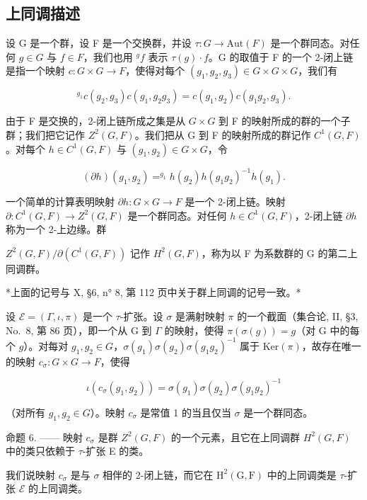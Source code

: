 \subsection{上同调描述}

设 G 是一个群，设 F 是一个交换群，并设 \(\tau: G \to \text{Aut}(F)\) 是一个群同态。对任何 \(g \in G\) 与 \(f \in F\)，我们也用 \(^{g}f\) 表示 \(\tau(g) \cdot f\)。G 的取值于 F 的一个 2-闭上链是指一个映射 \(c: G \times G \to F\)，使得对每个 \((g_{1}, g_{2}, g_{3}) \in G \times G \times G\)，我们有

\[
{ } ^ { g _ { 1 } } c ( g _ { 2 } , g _ { 3 } ) c ( g _ { 1 } , g _ { 2 } g _ { 3 } ) = c ( g _ { 1 } , g _ { 2 } ) c ( g _ { 1 } g _ { 2 } , g _ { 3 } ) .\tag{7}
\]

由于 F 是交换的，2-闭上链所成之集是从 \(G \times G\) 到 F 的映射所成的群的一个子群；我们把它记作 \(Z^{2}(G,F)\)。我们把从 G 到 F 的映射所成的群记作 \(C^{1}(G,F)\)。对每个 \(h \in C^{1}(G,F)\) 与 \((g_{1}, g_{2}) \in G \times G\)，令

\[
(\partial h) (g _ {1}, g _ {2}) = ^ {g _ {1}} h (g _ {2}) h (g _ {1} g _ {2}) ^ {- 1} h (g _ {1}).\tag{8}
\]

一个简单的计算表明映射 \(\partial h: G \times G \to F\) 是一个 2-闭上链。映射 \(\partial: C^{1}(G, F) \to Z^{2}(G, F)\) 是一个群同态。对任何 \(h \in C^{1}(G, F)\)，2-闭上链 \(\partial h\) 称为一个 2-上边缘。群

\(Z^{2}(G,F)/\partial(C^{1}(G,F))\) 记作 \(H^{2}(G,F)\)，称为以 F 为系数群的 G 的第二上同调群。

*上面的记号与 X, §6, n° 8, 第 112 页中关于群上同调的记号一致。*

设 \(\mathcal{E} = (\Gamma, \iota, \pi)\) 是一个 \(\tau\)-扩张。设 \(\sigma\) 是满射映射 \(\pi\) 的一个截面（集合论, II, §3, No.~8, 第 86 页），即一个从 G 到 \(\Gamma\) 的映射，使得 \(\pi(\sigma(g)) = g\)（对 G 中的每个 \(g\)）。对每对 \(g_1, g_2 \in G\)，\(\sigma(g_1)\sigma(g_2)\sigma(g_1g_2)^{-1}\) 属于 \(\mathrm{Ker}(\pi)\)，故存在唯一的映射 \(c_\sigma: G \times G \to F\)，使得

\[
\iota (c _ {\sigma} (g _ {1}, g _ {2})) = \sigma (g _ {1}) \sigma (g _ {2}) \sigma (g _ {1} g _ {2}) ^ {- 1}\tag{9}
\]

（对所有 \(g_{1}, g_{2} \in G\)）。映射 \(c_{\sigma}\) 是常值 1 的当且仅当 \(\sigma\) 是一个群同态。

命题 6. —— 映射 \(c_{\sigma}\) 是群 \(Z^{2}(G,F)\) 的一个元素，且它在上同调群 \(H^{2}(G,F)\) 中的类只依赖于 \(\tau\)-扩张 E 的类。

我们说映射 \(c_{\sigma}\) 是与 \(\sigma\) 相伴的 2-闭上链，而它在 \(\mathrm{H}^2 (\mathrm{G},\mathrm{F})\) 中的上同调类是 \(\tau\)-扩张 \(\mathcal{E}\) 的上同调类。

